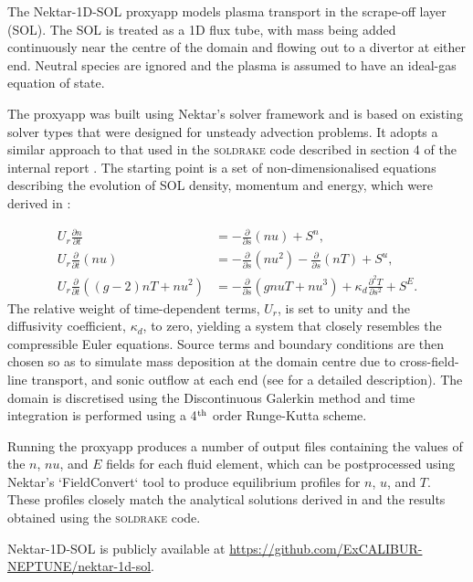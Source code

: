 
The Nektar-1D-SOL proxyapp models plasma transport in the scrape-off layer (SOL).
The SOL is treated as a 1D flux tube, with mass being added continuously near the centre of the domain and flowing out to a divertor at either end.
Neutral species are ignored and the plasma is assumed to have an ideal-gas equation of state.

The proxyapp was built using Nektar's solver framework and is based on existing solver types that were designed for unsteady advection problems.
It adopts a similar approach to that used in the \textsc{soldrake} code described in section 4 of the internal report \cite{y3re222}.
The starting point is a set of non-dimensionalised equations describing the evolution of SOL density, momentum and energy, which were derived in \cite{detach-rp2}:

\begin{align}
    U_r \frac{\partial n}{\partial t} &= 
        - \frac{\partial }{\partial s}(nu)
        + S^n, \label{eqn:n}\\
    U_r \frac{\partial }{\partial t} (nu)&= 
        - \frac{\partial }{\partial s} (nu^2)
        - \frac{\partial }{\partial s} (nT)
        + S^u, \label{eqn:u} \\
    U_r \frac{\partial }{\partial t} \left( (g-2)nT + nu^2  \right) &= 
        - \frac{\partial }{\partial s}(gnuT + nu^3)
        + \kappa_d \frac{\partial^2  T}{\partial s^2}
        + S^E. \label{eqn:T}
\end{align}
The relative weight of time-dependent terms, $U_r$, is set to unity and the diffusivity coefficient, $\kappa_d$, to zero, yielding a system that closely resembles the compressible Euler equations.
Source terms and boundary conditions are then chosen so as to simulate mass deposition at the domain centre due to cross-field-line transport, and sonic outflow at each end (see \cite{y3re222} for a detailed description).
The domain is discretised using the Discontinuous Galerkin method and time integration is performed using a 4$^{\rm th}$ order Runge-Kutta scheme.

Running the proxyapp produces a number of output files containing the values of the $n$, $nu$, and $E$ fields for each fluid element, which can be postprocessed using Nektar's `FieldConvert` tool to produce equilibrium profiles for $n$, $u$, and $T$.
These profiles closely match the analytical solutions derived in \cite{detach-rp2} and the results obtained using the \textsc{soldrake} code.

Nektar-1D-SOL is publicly available at \url{https://github.com/ExCALIBUR-NEPTUNE/nektar-1d-sol}.
